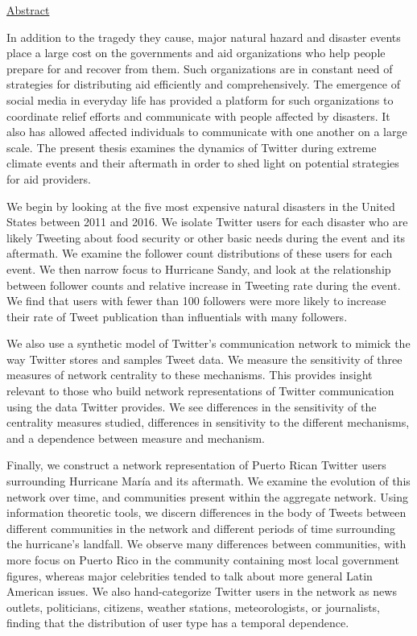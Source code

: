 \documentclass[14pt]{article}
\renewenvironment{abstract}{
    \thispagestyle{empty}
    \newpage
    \vspace*{.7cm}
    \begin{center}\underline{Abstract}\end{center}
    \setlength{\parindent}{0.5in}
    \setlength{\parskip}{0in}
    \begin{small}
}{
    \pagenumbering{gobble}
    \newpage
    \end{small}
}
\begin{document}
\begin{abstract}

In addition to the tragedy they cause, major natural hazard and disaster events place a large cost on the governments and aid organizations who help people prepare for and recover from them. Such organizations are in constant need of strategies for distributing aid efficiently and comprehensively. The emergence of social media in everyday life has provided a platform for such organizations to coordinate relief efforts and communicate with people affected by disasters. It also has allowed affected individuals to communicate with one another on a large scale. The present thesis examines the dynamics of Twitter during extreme climate events and their aftermath in order to shed light on potential strategies for aid providers.

We begin by looking at the five most expensive natural disasters in the United States between 2011 and 2016. We isolate Twitter users for each disaster who are likely Tweeting about food security or other basic needs during the event and its aftermath. We examine the follower count distributions of these users for each event. We then narrow focus to Hurricane Sandy, and look at the relationship between follower counts and relative increase in Tweeting rate during the event. We find that users with fewer than 100 followers were more likely to increase their rate of Tweet publication than influentials with many followers.

We also use a synthetic model of Twitter's communication network to mimick the way Twitter stores and samples Tweet data. We measure the sensitivity of three measures of network centrality to these mechanisms. This provides insight relevant to those who build network representations of Twitter communication using the data Twitter provides. We see differences in the sensitivity of the centrality measures studied, differences in sensitivity to the different mechanisms, and a dependence between measure and mechanism.

Finally, we construct a network representation of Puerto Rican Twitter users surrounding Hurricane Mar\'ia and its aftermath. We examine the evolution of this network over time, and communities present within the aggregate network. Using information theoretic tools, we discern differences in the body of Tweets between different communities in the network and different periods of time surrounding the hurricane's landfall. We observe many differences between communities, with more focus on Puerto Rico in the community containing most local government figures, whereas major celebrities tended to talk about more general Latin American issues. We also hand-categorize Twitter users in the network as news outlets, politicians, citizens, weather stations, meteorologists, or journalists, finding that the distribution of user type has a temporal dependence.

\end{abstract}
\end{document}
